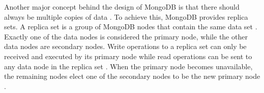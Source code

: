 Another major concept behind the design of MongoDB is that there should always be multiple copies of data \parencite[p. 2]{Membrey2014}. To achieve this, MongoDB 
provides replica sets. A replica set is a group of MongoDB nodes that contain the same data set \parencites{Mongo-Replication}[p. 90]{chauhan2019review}. Exactly 
one of the data nodes is considered the primary node, while the other data nodes are secondary nodes. Write operations to a replica set can only be received and
executed by its primary node while read operations can be sent to any data node in the replica set \parencite{Mongo-Replication}. When the primary node becomes 
unavailable, the remaining nodes elect one of the secondary nodes to be the new primary node \parencite{Mongo-Replication}. 
